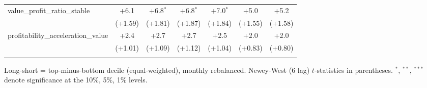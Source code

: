 \begin{table}[htbp]
\begin{threeparttable}
\begin{tabular}{lcccccc}
value\_profit\_ratio\_stable & +6.1 & +6.8$^{*}$ & +6.8$^{*}$ & +7.0$^{*}$ & +5.0 & +5.2 \\
 & (+1.59) & (+1.81) & (+1.87) & (+1.84) & (+1.55) & (+1.58) \\
\addlinespace
profitability\_acceleration\_value & +2.4 & +2.7 & +2.7 & +2.5 & +2.0 & +2.0 \\
 & (+1.01) & (+1.09) & (+1.12) & (+1.04) & (+0.83) & (+0.80) \\
\addlinespace
\bottomrule
\end{tabular}
\begin{tablenotes}\footnotesize
\item Long-short = top-minus-bottom decile (equal-weighted), monthly rebalanced. Newey-West (6 lag) $t$-statistics in parentheses. $^{*}$, $^{**}$, $^{***}$ denote significance at the 10\%, 5\%, 1\% levels.
\end{tablenotes}
\end{threeparttable}
\end{table}